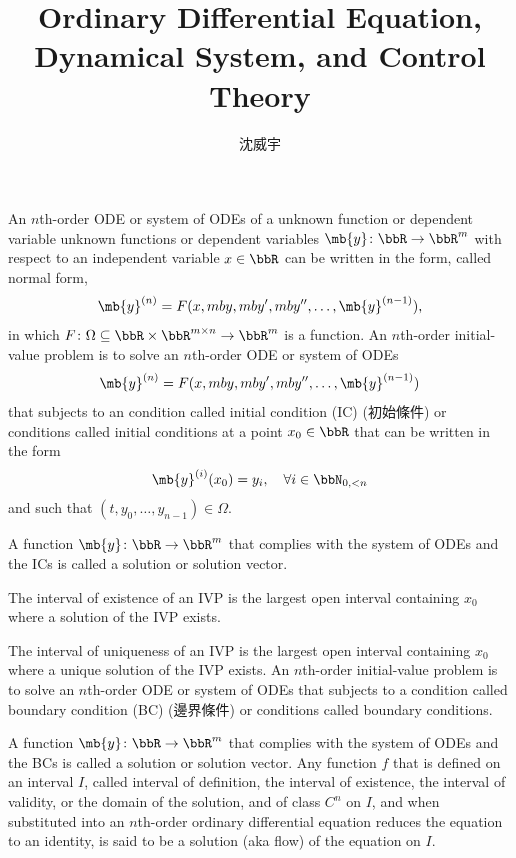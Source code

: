 \documentclass[a4paper,12pt]{report}
\begin{document}
\title{Ordinary Differential Equation, Dynamical System, and Control Theory}
\author{沈威宇}
\date{\temtoday}
\titletocdoc
{}
An $n$th-order ODE or system of ODEs of a unknown function or dependent variable unknown functions or dependent variables $\mb{y}\colon\bbR\to\bbR^m$ with respect to an independent variable $x\in\bbR$ can be written in the form, called normal form,
\[\mb{y}^{(n)}=F(x,mb{y},mb{y}',mb{y}'',\ldots,\mb{y}^{(n-1)}),\]
in which $F\colon\Omega\subseteq\bbR\times\bbR^{m\times n}\to\bbR^m$ is a function.
An $n$th-order initial-value problem is to solve an $n$th-order ODE or system of ODEs
\[\mb{y}^{(n)}=F(x,mb{y},mb{y}',mb{y}'',\ldots,\mb{y}^{(n-1)})\]
that subjects to an condition called initial condition (IC) (初始條件) or conditions called initial conditions at a point $x_0\in\bbR$ that can be written in the form
\[\mb{y}^{(i)}(x_0)=y_i,\quad\forall i\in\bbN_{0,<n}\]
and such that $(t,y_0,\ldots,y_{n-1})\in\Omega$.

A function $\mb{y}\colon\bbR\to\bbR^m$ that complies with the system of ODEs and the ICs is called a solution or solution vector.

The interval of existence of an IVP is the largest open interval containing $x_0$ where a solution of the IVP exists.

The interval of uniqueness of an IVP is the largest open interval containing $x_0$ where a unique solution of the IVP exists.
An $n$th-order initial-value problem is to solve an $n$th-order ODE or system of ODEs that subjects to a condition called boundary condition (BC) (邊界條件) or conditions called boundary conditions.

A function $\mb{y}\colon\bbR\to\bbR^m$ that complies with the system of ODEs and the BCs is called a solution or solution vector.
Any function $f$ that is defined on an interval $I$, called interval of definition, the interval of existence, the interval of validity, or the domain of the solution, and of class $C^n$ on $I$, and when substituted into an $n$th-order ordinary differential equation reduces the equation to an identity, is said to be a solution (aka flow) of the equation on $I$.
\end{document}
